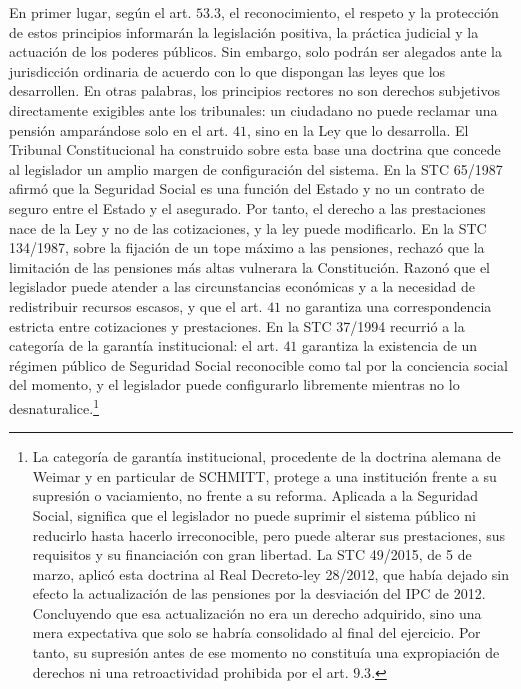 \documentclass[10pt,a4paper]{article}
\begin{document}
En primer lugar, según el art. $53.3$, el reconocimiento, el respeto y la protección de estos principios informarán la legislación positiva, la práctica judicial y la actuación de los poderes públicos. Sin embargo, solo podrán ser alegados ante la jurisdicción ordinaria de acuerdo con lo que dispongan las leyes que los desarrollen. En otras palabras, los principios rectores no son derechos subjetivos directamente exigibles ante los tribunales: un ciudadano no puede reclamar una pensión amparándose solo en el art. $41$, sino en la Ley que lo desarrolla. El Tribunal Constitucional ha construido sobre esta base una doctrina que concede al legislador un amplio margen de configuración del sistema. En la STC 65/1987 afirmó que la Seguridad Social es una función del Estado y no un contrato de seguro entre el Estado y el asegurado. Por tanto, el derecho a las prestaciones nace de la Ley y no de las cotizaciones, y la ley puede modificarlo. En la STC 134/1987, sobre la fijación de un tope máximo a las pensiones, rechazó que la limitación de las pensiones más altas vulnerara la Constitución. Razonó que el legislador puede atender a las circunstancias económicas y a la necesidad de redistribuir recursos escasos, y que el art. $41$ no garantiza una correspondencia estricta entre cotizaciones y prestaciones. En la STC 37/1994 recurrió a la categoría de la garantía institucional: el art. $41$ garantiza la existencia de un régimen público de Seguridad Social reconocible como tal por la conciencia social del momento, y el legislador puede configurarlo libremente mientras no lo desnaturalice.\footnote{
La categoría de garantía institucional, procedente de la doctrina alemana de Weimar y en particular de SCHMITT, protege a una institución frente a su supresión o vaciamiento, no frente a su reforma. Aplicada a la Seguridad Social, significa que el legislador no puede suprimir el sistema público ni reducirlo hasta hacerlo irreconocible, pero puede alterar sus prestaciones, sus requisitos y su financiación con gran libertad. La STC 49/2015, de 5 de marzo, aplicó esta doctrina al Real Decreto-ley 28/2012, que había dejado sin efecto la actualización de las pensiones por la desviación del IPC de 2012. Concluyendo que esa actualización no era un derecho adquirido, sino una mera expectativa que solo se habría consolidado al final del ejercicio. Por tanto, su supresión antes de ese momento no constituía una expropiación de derechos ni una retroactividad prohibida por el art. $9.3$.

}
\end{document}
